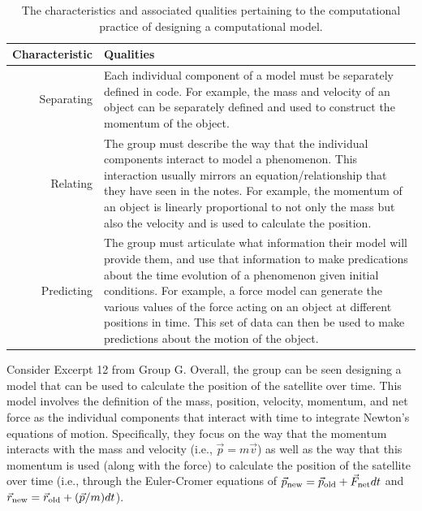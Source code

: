 \documentclass{msuphddissertation}
\begin{document}
\begin{doublespace}
\begin{table}
\begin{tabular}{r|p{}}
Characteristic & Qualities \\\hline\hline
Separating & Each individual component of a model must be separately defined in code.  For example, the mass and velocity of an object can be separately defined and used to construct the momentum of the object.\\
Relating & The group must describe the way that the individual components interact to model a phenomenon.  This interaction usually mirrors an equation/relationship that they have seen in the notes.  For example, the momentum of an object is linearly proportional to not only the mass but also the velocity and is used to calculate the position.\\
Predicting & The group must articulate what information their model will provide them, and use that information to make predications about the time evolution of a phenomenon given initial conditions.  For example, a force model can generate the various values of the force acting on an object at different positions in time.  This set of data can then be used to make predictions about the motion of the object.\\
\end{tabular}\caption{The characteristics and associated qualities pertaining to the computational practice of designing a computational model.}
\end{table}

Consider Excerpt 12 from Group G.  Overall, the group can be seen designing a model that can be used to calculate the position of the satellite over time.  This model involves the definition of the mass, position, velocity, momentum, and net force as the individual components that interact with time to integrate Newton's equations of motion.  Specifically, they focus on the way that the momentum interacts with the mass and velocity (i.e., $\vec{p}=m\vec{v}$) as well as the way that this momentum is used (along with the force) to calculate the position of the satellite over time (i.e., through the Euler-Cromer equations of $\vec{p}_{\rm new}=\vec{p}_{\rm old}+\vec{F}_{\rm net}dt$ and $\vec{r}_{\rm new}=\vec{r}_{\rm old}+(\vec{p}/m)dt$).


\end{doublespace}
\end{document}
